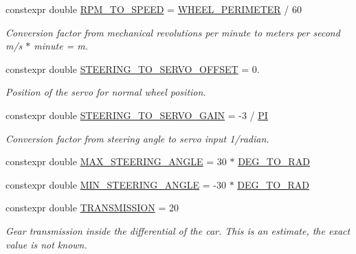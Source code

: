\begin{DoxyCompactItemize}
constexpr double \hyperlink{namespacecar__config_aee034b6adfd7932f245bc94d869f2bb6}{R\+P\+M\+\_\+\+T\+O\+\_\+\+S\+P\+E\+ED} = \hyperlink{namespacecar__config_a46fe00906da07d2e030b586a634cd907}{W\+H\+E\+E\+L\+\_\+\+P\+E\+R\+I\+M\+E\+T\+ER} / 60
\begin{DoxyCompactList}\small\item\em Conversion factor from mechanical revolutions per minute to meters per second  m/s $\ast$ minute = m. \end{DoxyCompactList}\item 
constexpr double \hyperlink{namespacecar__config_abb6ef746663276219b321683dfbb8896}{S\+T\+E\+E\+R\+I\+N\+G\+\_\+\+T\+O\+\_\+\+S\+E\+R\+V\+O\+\_\+\+O\+F\+F\+S\+ET} = 0.
\begin{DoxyCompactList}\small\item\em Position of the servo for normal wheel position. \end{DoxyCompactList}\item 
constexpr double \hyperlink{namespacecar__config_aa8ab85fe7b8ab728f34d15028f114d86}{S\+T\+E\+E\+R\+I\+N\+G\+\_\+\+T\+O\+\_\+\+S\+E\+R\+V\+O\+\_\+\+G\+A\+IN} = -\/3 / \hyperlink{namespacecar__config_a90cb9957197db8924811c447bc98703a}{PI}
\begin{DoxyCompactList}\small\item\em Conversion factor from steering angle to servo input  1/radian. \end{DoxyCompactList}\item 
constexpr double \hyperlink{namespacecar__config_a967b325af26effe80fbbc64dc68a36a0}{M\+A\+X\+\_\+\+S\+T\+E\+E\+R\+I\+N\+G\+\_\+\+A\+N\+G\+LE} = 30 $\ast$ \hyperlink{namespacecar__config_a72deaa1a555d694e52fb768ffba1d8cb}{D\+E\+G\+\_\+\+T\+O\+\_\+\+R\+AD}
\item 
constexpr double \hyperlink{namespacecar__config_a38229ce5d2e17e0c30b86864fb20d9ce}{M\+I\+N\+\_\+\+S\+T\+E\+E\+R\+I\+N\+G\+\_\+\+A\+N\+G\+LE} = -\/30 $\ast$ \hyperlink{namespacecar__config_a72deaa1a555d694e52fb768ffba1d8cb}{D\+E\+G\+\_\+\+T\+O\+\_\+\+R\+AD}
\item 
constexpr double \hyperlink{namespacecar__config_a7af97a6c9168673aba8917029cfe44d3}{T\+R\+A\+N\+S\+M\+I\+S\+S\+I\+ON} = 20
\begin{DoxyCompactList}\small\item\em Gear transmission inside the differential of the car. This is an estimate, the exact value is not known. \end{DoxyCompactList}\item 

\end{DoxyCompactItemize}
